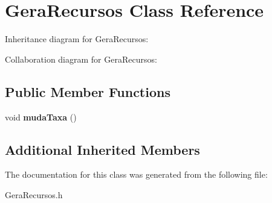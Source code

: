 \hypertarget{classGeraRecursos}{}\section{Gera\+Recursos Class Reference}
\label{classGeraRecursos}


Inheritance diagram for Gera\+Recursos\+:


Collaboration diagram for Gera\+Recursos\+:
\subsection*{Public Member Functions}
\begin{DoxyCompactItemize}
\item 
void {\bfseries muda\+Taxa} ()\hypertarget{classGeraRecursos_a5a791bbd0d33f7fbdc3cb9f00aa7b110}{}\label{classGeraRecursos_a5a791bbd0d33f7fbdc3cb9f00aa7b110}

\end{DoxyCompactItemize}
\subsection*{Additional Inherited Members}


The documentation for this class was generated from the following file\+:\begin{DoxyCompactItemize}
\item 
Gera\+Recursos.\+h\end{DoxyCompactItemize}
